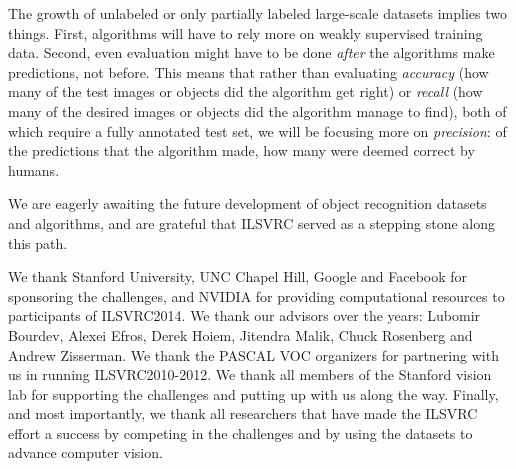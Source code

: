 The growth of unlabeled or only partially labeled large-scale datasets implies two things. First, algorithms will have to rely more on weakly supervised training data. Second, even evaluation might have to be done \emph{after} the algorithms make predictions, not before. This means that rather than evaluating \emph{accuracy} (how many of the test images or objects did the algorithm get right) or \emph{recall} (how many of the desired images or objects did the algorithm manage to find), both of which require a fully annotated test set, we will be focusing more on \emph{precision}: of the predictions that the algorithm made, how many were deemed correct by humans. 

We are eagerly awaiting the future development of object recognition datasets and algorithms, and are grateful that ILSVRC served as a stepping stone along this path. 


\begin{acknowledgements}
We thank Stanford University, UNC Chapel Hill, Google and Facebook for sponsoring the challenges, and NVIDIA for providing computational resources to participants of ILSVRC2014. 
We thank our advisors over the years: Lubomir Bourdev, Alexei Efros, Derek Hoiem, Jitendra Malik, Chuck Rosenberg and Andrew Zisserman. We thank the PASCAL VOC organizers for partnering with us in running ILSVRC2010-2012.
We thank all members of the Stanford vision lab for supporting the challenges and putting up with us along the way. Finally, and most importantly, we thank all researchers that have made the ILSVRC effort a success by competing in the challenges and by using the datasets to advance  computer vision. 
\end{acknowledgements}





%
%


